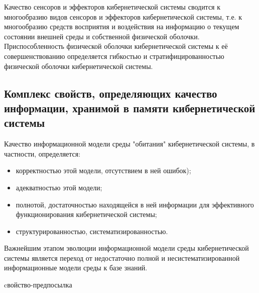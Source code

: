 Качество сенсоров и эффекторов кибернетической системы сводится к многообразию видов сенсоров и эффекторов кибернетической системы, т.е. к многообразию средств восприятия и воздействия на информацию о текущем состоянии внешней среды и собственной физической оболочки.
Приспособленность физической оболочки кибернетической системы к её совершенствованию определяется гибкостью и стратифицированностью физической оболочки кибернетической системы.



\subsection{Комплекс свойств, определяющих качество информации, хранимой в памяти кибернетической системы}

Качество информационной модели среды "обитания"{} кибернетической системы, в частности, определяется:
\begin{itemize}
    \item{корректностью этой модели, отсутствием в ней ошибок);}
    \item{адекватностью этой модели;}
    \item{полнотой, достаточностью находящейся в ней информации для эффективного функционирования кибернетической системы;}
    \item{структурированностью, систематизированностью.}
\end{itemize}

Важнейшим этапом эволюции информационной модели среды кибернетической системы является переход от недостаточно полной и несистематизированной информационные модели среды к базе знаний.

\begin{SCn}
\begin{scnrelfromlist}{cвойство-предпосылка}
\end{scnrelfromlist}
\end{SCn}

